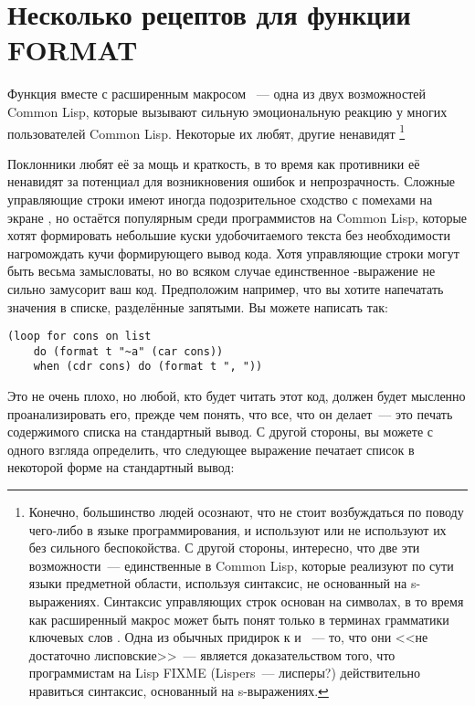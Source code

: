 \chapter{Несколько рецептов для функции FORMAT}
\label{ch:18}

Функция  вместе с расширенным макросом ~--- одна из двух
возможностей Common Lisp, которые вызывают сильную эмоциональную реакцию у многих
пользователей Common Lisp. Некоторые их любят, другие ненавидят \footnote{Конечно,
  большинство людей осознают, что не стоит возбуждаться по поводу чего-либо в языке
  программирования, и используют или не используют их без сильного беспокойства. С другой
  стороны, интересно, что две эти возможности~--- единственные в Common Lisp, которые
  реализуют по сути языки предметной области, используя синтаксис, не основанный на
  s-выражениях. Синтаксис управляющих строк  основан на символах, в то время
  как расширенный макрос  может быть понят только в терминах грамматики
  ключевых слов . Одна из обычных придирок к  и ~--- то,
  что они <<не достаточно лисповские>>~--- является доказательством того, что программистам на
  Lisp FIXME (Lispers~--- лисперы?)  действительно нравиться синтаксис, основанный на
  s-выражениях.}

Поклонники  любят её за мощь и краткость, в то время как противники её
ненавидят за потенциал для возникновения ошибок и непрозрачность. Сложные управляющие
строки  имеют иногда подозрительное сходство с помехами на экране
 , но
 остаётся популярным среди программистов на Common Lisp, которые хотят
формировать небольшие куски удобочитаемого текста без необходимости нагромождать кучи
формирующего вывод кода. Хотя управляющие строки  могут быть весьма
замысловаты, но во всяком случае единственное -выражение не сильно замусорит
ваш код. Предположим например, что вы хотите напечатать значения в списке, разделённые
запятыми. Вы можете написать так:

\begin{lstlisting}
(loop for cons on list
    do (format t "~a" (car cons))
    when (cdr cons) do (format t ", "))
\end{lstlisting}

Это не очень плохо, но любой, кто будет читать этот код, должен будет мысленно
проанализировать его, прежде чем понять, что все, что он делает~--- это печать содержимого
списка  на стандартный вывод. С другой стороны, вы можете с одного взгляда
определить, что следующее выражение печатает список в некоторой форме на стандартный
вывод:

